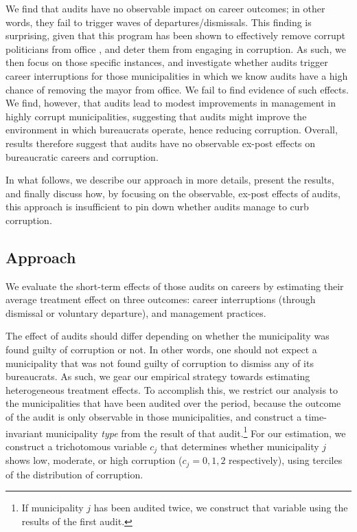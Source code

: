 We find that audits have no observable impact on career outcomes; in other words, they fail to trigger waves of departures/dismissals. This finding is surprising, given that this  program has been shown to effectively remove corrupt politicians from office \citep{ferraz_exposing_2008,ferraz_electoral_2011}, and deter them from engaging in corruption. As such, we then focus on those specific instances, and investigate whether audits trigger career interruptions for those municipalities in which we know audits have a high chance of removing the mayor from office. We fail to find evidence of such effects. We find, however, that audits lead to modest improvements in management in highly corrupt municipalities, suggesting that audits might improve the environment in which bureaucrats operate, hence reducing corruption. Overall, results therefore suggest that audits have no observable ex-post effects on bureaucratic careers and corruption. 

In what follows, we describe our approach in more details, present the results, and finally discuss how, by focusing on the observable, ex-post effects of audits, this approach is insufficient to pin down whether audits manage to curb corruption.

\subsection{Approach}
\label{sub:empiricalStrategy}

We evaluate the short-term effects of those audits on careers by estimating their average treatment effect on three outcomes: career interruptions (through dismissal or voluntary departure), and management practices. 

The effect of audits should differ depending on whether the municipality was found guilty of corruption or not. In other words, one should not expect a municipality that was not found guilty of corruption to dismiss any of its bureaucrats. As such, we gear our empirical strategy towards estimating heterogeneous treatment effects. To accomplish this, we restrict our analysis to the municipalities that have been audited over the period, because the outcome of the audit is only observable in those municipalities, and construct a time-invariant municipality \emph{type} from the result of that audit.\footnote{If municipality $j$ has been audited twice, we construct that variable using the results of the first audit.} For our estimation, we construct a trichotomous variable $c_j$ that determines whether municipality $j$ shows low, moderate, or high corruption ($c_j = 0, 1, 2$ respectively), using terciles of the distribution of corruption. 

